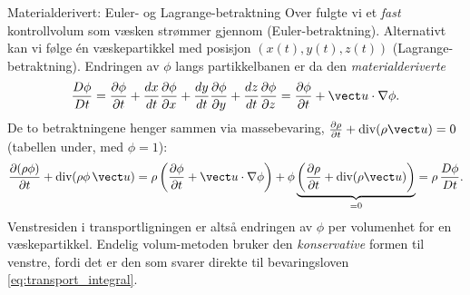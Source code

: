 \begin{rem}{Materialderivert: Euler- og Lagrange-betraktning}
Over fulgte vi et \emph{fast} kontrollvolum som væsken strømmer gjennom (Euler-betraktning). Alternativt kan vi følge én væskepartikkel med posisjon $(x(t),y(t),z(t))$ (Lagrange-betraktning). Endringen av $\phi$ langs partikkelbanen er da den \emph{materialderiverte}
\[
\frac{D\phi}{Dt} = \frac{\partial\phi}{\partial t} + \frac{dx}{dt}\frac{\partial\phi}{\partial x} + \frac{dy}{dt}\frac{\partial\phi}{\partial y} + \frac{dz}{dt}\frac{\partial\phi}{\partial z} = \frac{\partial\phi}{\partial t} + \vect u\cdot\nabla\phi .
\]
De to betraktningene henger sammen via massebevaring, $\frac{\partial\rho}{\partial t}+\text{div}(\rho\vect u)=0$ (tabellen under, med $\phi=1$):
\[
\frac{\partial(\rho\phi)}{\partial t} + \text{div}(\rho\phi\,\vect u)
= \rho\left(\frac{\partial\phi}{\partial t} + \vect u\cdot\nabla\phi\right) + \phi\underbrace{\left(\frac{\partial\rho}{\partial t} + \text{div}(\rho\vect u)\right)}_{=0}
= \rho\,\frac{D\phi}{Dt}.
\]
Venstresiden i transportligningen er altså endringen av $\phi$ per volumenhet for en væskepartikkel. Endelig volum-metoden bruker den \emph{konservative} formen til venstre, fordi det er den som svarer direkte til bevaringsloven \eqref{eq:transport_integral}.
\end{rem}

